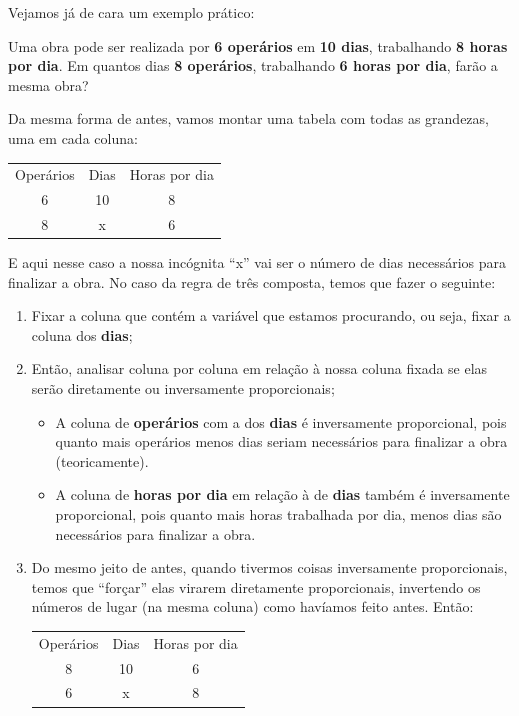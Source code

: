 Vejamos já de cara um exemplo prático:

\begin{exemplo}
    Uma obra pode ser realizada por \textbf{6 operários} em \textbf{10 dias}, trabalhando \textbf{8 horas por dia}. Em quantos dias \textbf{8 operários}, trabalhando \textbf{6 horas por dia}, farão a mesma obra?

    \vspace{0.5cm}

    Da mesma forma de antes, vamos montar uma tabela com todas as grandezas, uma em cada coluna:

    \begin{table}[H]
        \centering
        \begin{tabular}{ccc}
            Operários & Dias & Horas por dia\\
             6 & 10 & 8\\
             8 & x & 6
        \end{tabular}

    \end{table}

    E aqui nesse caso a nossa incógnita ``x'' vai ser o número de dias necessários para finalizar a obra. No caso da regra de três composta, temos que fazer o seguinte:

    \begin{enumerate}
        \item Fixar a coluna que contém a variável que estamos procurando, ou seja, fixar a coluna dos \textbf{dias};
        \item Então, analisar coluna por coluna em relação à nossa coluna fixada se elas serão diretamente ou inversamente proporcionais;
        \begin{itemize}
            \item A coluna de \textbf{operários} com a dos \textbf{dias} é inversamente proporcional, pois quanto mais operários menos dias seriam necessários para finalizar a obra (teoricamente).
            \item A coluna de \textbf{horas por dia} em relação à de \textbf{dias} também é inversamente proporcional, pois quanto mais horas trabalhada por dia, menos dias são necessários para finalizar a obra.
        \end{itemize}
        \item Do mesmo jeito de antes, quando tivermos coisas inversamente proporcionais, temos que ``forçar'' elas virarem diretamente proporcionais, invertendo os números de lugar (na mesma coluna) como havíamos feito antes. Então:
        \begin{table}[H]
            \centering
            \begin{tabular}{ccc}
             Operários & Dias & Horas por dia\\
             8 & 10 & 6\\
             6 & x & 8 
            \end{tabular}


\end{table}
\end{enumerate}
\end{exemplo}
